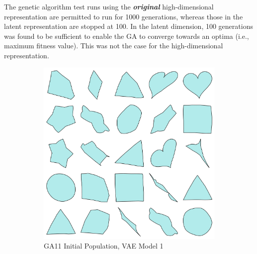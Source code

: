 \documentclass{article}
\begin{document}
The genetic algorithm test runs using the \textbf{\textit{original}} high-dimensional representation are permitted to run for 1000 generations, whereas those in the latent representation are stopped at 100. In the latent dimension, 100 generations was found to be sufficient to enable the GA to converge towards an optima (i.e., maximum fitness value). This was not the case for the high-dimensional representation. 

\begin{figure}[h]
    \centering
    \begin{subfigure}[b]{0.45\textwidth}
        \centering
        \includegraphics[width=\textwidth]{figures/latent_gen_shapes/GA_11_50_init_pop.png}
        \caption{GA11 Initial Population, VAE Model 1}
        \label{fig:latent_shape_popM1}
    \end{subfigure}
    \hfill
    \begin{subfigure}[b]{0.45\textwidth}
        \centering

\end{subfigure}
\end{figure}
\end{document}
